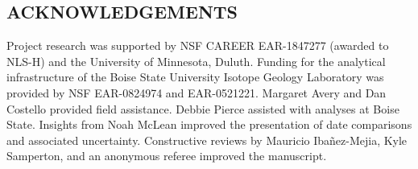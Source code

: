 \documentclass[11pt,letterpaper]{article}
\begin{document}


\subsection*{ACKNOWLEDGEMENTS}
Project research was supported by NSF CAREER EAR-1847277 (awarded to NLS-H) and the University of Minnesota, Duluth. Funding for the analytical infrastructure of the Boise State University Isotope Geology Laboratory was provided by NSF EAR-0824974 and EAR-0521221. Margaret Avery and Dan Costello provided field assistance. Debbie Pierce assisted with analyses at Boise State. Insights from Noah McLean improved the presentation of date comparisons and associated uncertainty. Constructive reviews by Mauricio Iba\~nez-Mejia, Kyle Samperton, and an anonymous referee improved the manuscript.
\footnotesize

\singlespacing



\end{document}
